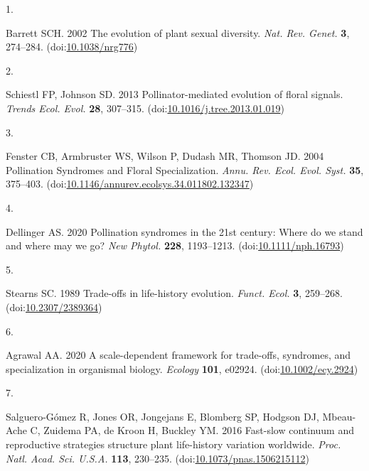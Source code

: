 \documentclass[
  12pt,
  a4paper,
]{article}
\newlength{\cslhangindent}
\newlength{\csllabelwidth}
\newlength{\cslentryspacingunit} %
\newenvironment{CSLReferences}[2] %
 {%
  \setlength{\parindent}{0pt}
  \ifodd #1
  \let\oldpar\par
  \def\par{\hangindent=\cslhangindent\oldpar}
  \fi
  \setlength{\parskip}{#2\cslentryspacingunit}
 }%
 {}
\newcommand{\CSLLeftMargin}[1]{\parbox[t]{\csllabelwidth}{#1}}
\newcommand{\CSLRightInline}[1]{\parbox[t]{\linewidth - \csllabelwidth}{#1}\break}
\begin{document}
\hypertarget{refs}{}
\begin{CSLReferences}{0}{0}
\leavevmode{}%
\CSLLeftMargin{1. }
\CSLRightInline{Barrett SCH. 2002 The evolution of plant sexual diversity. \emph{Nat. Rev. Genet.} \textbf{3}, 274--284. (doi:\href{https://doi.org/10.1038/nrg776}{10.1038/nrg776})}

\leavevmode{}%
\CSLLeftMargin{2. }
\CSLRightInline{Schiestl FP, Johnson SD. 2013 Pollinator-mediated evolution of floral signals. \emph{Trends Ecol. Evol.} \textbf{28}, 307--315. (doi:\href{https://doi.org/10.1016/j.tree.2013.01.019}{10.1016/j.tree.2013.01.019})}

\leavevmode{}%
\CSLLeftMargin{3. }
\CSLRightInline{Fenster CB, Armbruster WS, Wilson P, Dudash MR, Thomson JD. 2004 Pollination {Syndromes} and {Floral Specialization}. \emph{Annu. Rev. Ecol. Evol. Syst.} \textbf{35}, 375--403. (doi:\href{https://doi.org/10.1146/annurev.ecolsys.34.011802.132347}{10.1146/annurev.ecolsys.34.011802.132347})}

\leavevmode{}%
\CSLLeftMargin{4. }
\CSLRightInline{Dellinger AS. 2020 Pollination syndromes in the 21st century: Where do we stand and where may we go? \emph{New Phytol.} \textbf{228}, 1193--1213. (doi:\href{https://doi.org/10.1111/nph.16793}{10.1111/nph.16793})}

\leavevmode{}%
\CSLLeftMargin{5. }
\CSLRightInline{Stearns SC. 1989 Trade-offs in life-history evolution. \emph{Funct. Ecol.} \textbf{3}, 259--268. (doi:\href{https://doi.org/10.2307/2389364}{10.2307/2389364})}

\leavevmode{}%
\CSLLeftMargin{6. }
\CSLRightInline{Agrawal AA. 2020 A scale-dependent framework for trade-offs, syndromes, and specialization in organismal biology. \emph{Ecology} \textbf{101}, e02924. (doi:\href{https://doi.org/10.1002/ecy.2924}{10.1002/ecy.2924})}

\leavevmode{}%
\CSLLeftMargin{7. }
\CSLRightInline{Salguero-Gómez R, Jones OR, Jongejans E, Blomberg SP, Hodgson DJ, Mbeau-Ache C, Zuidema PA, de Kroon H, Buckley YM. 2016 Fast-slow continuum and reproductive strategies structure plant life-history variation worldwide. \emph{Proc. Natl. Acad. Sci. U.S.A.} \textbf{113}, 230--235. (doi:\href{https://doi.org/10.1073/pnas.1506215112}{10.1073/pnas.1506215112})}


\end{CSLReferences}
\end{document}
